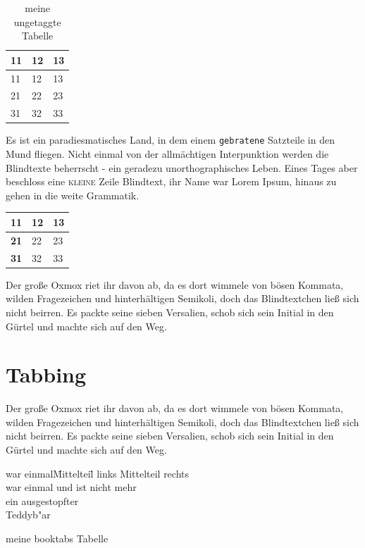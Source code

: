 \documentclass[%
	12pt,%
	a4paper,%
	oneside,%
	liststotoc, idxtotoc, bibtotoc, %
	parskip=half,%
	nochapterprefix,%
	appendixprefix, %
	headings=small,%
]{scrreprt}
\newcommand{\thead}[1]{\textbf{#1}}
\begin{document}
\begin{table}[htbp]
	\centering
		\begin{tabular}{l|l l}
			\thead{11} & \thead{12} & \thead{13} \\ \hline
			11 & 12 & 13 \\
			21 & 22 & 23 \\
			31 & 32 & 33 
		\end{tabular}
	\caption{meine ungetaggte Tabelle}
	\label{tab:meineUngetaggteTabelle}
\end{table}

Es ist ein paradiesmatisches Land, in dem einem \texttt{gebratene} Satzteile in den Mund fliegen. Nicht einmal von der allmächtigen Interpunktion%
 werden die Blindtexte beherrscht - ein geradezu unorthographisches Leben. Eines Tages aber beschloss eine \textsc{kleine} Zeile Blindtext, ihr Name war Lorem Ipsum, hinaus zu gehen in die weite Grammatik.

		\begin{tabular}{l l l}
			\toprule
			\thead{11} & 12 & 13 \\ \midrule
			\thead{21} & 22 & 23 \\
			\thead{31} & 32 & 33 \\ \bottomrule
		\end{tabular}


Der große Oxmox riet ihr davon ab, da es dort wimmele von bösen Kommata, wilden Fragezeichen und hinterhältigen Semikoli, doch das Blindtextchen ließ sich nicht beirren. Es packte seine sieben Versalien, schob sich sein Initial in den Gürtel und machte sich auf den Weg. 

\chapter{Tabbing}
\label{sec:Tabbing}

Der große Oxmox riet ihr davon ab, da es dort wimmele von bösen Kommata, wilden Fragezeichen und hinterhältigen Semikoli, doch das Blindtextchen ließ sich nicht beirren. Es packte seine sieben Versalien, schob sich sein Initial in den Gürtel und machte sich auf den Weg. 

\begin{table}[htbp]
	\centering
\begin{tabbing}
war einmal\quad \= Mittelteil\quad \= \kill
links \> Mittelteil \> rechts\\
war einmal \> und ist \> nicht mehr\\
ein \>  \> ausgestopfter\\
 \>  \> Teddyb"ar
\end{tabbing}
	\caption{meine booktabs Tabelle}
	\label{tab:meinebooktabsTabelle}
\end{table}
\end{document}
